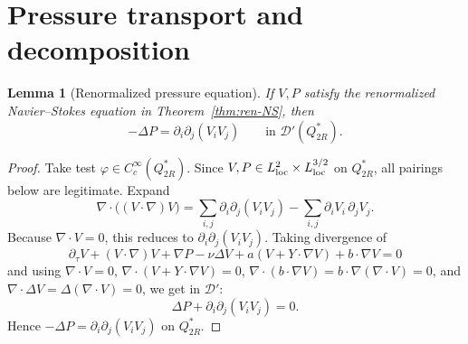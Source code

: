 \documentclass[11pt]{amsart}
\theoremstyle{plain}
\newtheorem{lemma}[theorem]{Lemma}
\theoremstyle{definition}
\theoremstyle{remark}
\newcommand{\nn}{\nabla}
\begin{document}
\section{Pressure transport and decomposition}\label{sec:pressure}
\begin{lemma}[Renormalized pressure equation]\label{lem:pressure-eq}
If \(V,P\) satisfy the renormalized Navier--Stokes equation in
Theorem~\ref{thm:ren-NS}, then
\[
-\Delta P=\partial_i\partial_j(V_iV_j)\qquad\text{in }\mathcal D'(Q_{2R}^*).
\]
\end{lemma}
\begin{proof}
Take test \(\varphi\in C_c^\infty(Q_{2R}^*)\). Since \(V,P\in L^2_{\rm loc}\times
L^{3/2}_{\rm loc}\) on \(Q_{2R}^*\), all pairings below are legitimate.
Expand
\[
\nn\cdot\bigl((V\cdot\nabla)V\bigr)
=\sum_{i,j}\partial_i\partial_j(V_iV_j)-\sum_{i,j}\partial_iV_i\,\partial_jV_j.
\]
Because \(\nn\cdot V=0\), this reduces to \(\partial_i\partial_j(V_iV_j)\).
Taking divergence of
\[
\partial_\tau V+(V\cdot\nabla)V+\nabla P-\nu\Delta V
+a(V+Y\cdot\nabla V)+b\cdot\nabla V=0
\]
and using \(\nn\cdot V=0\), \(\nn\cdot(V+Y\cdot\nabla V)=0\), \(\nn\cdot(b\cdot\nabla V)=b\cdot\nn(\nn\cdot V)=0\),
and \(\nn\cdot\Delta V=\Delta(\nn\cdot V)=0\), we get in \(\mathcal D'\):
\[
\Delta P+\partial_i\partial_j(V_iV_j)=0.
\]
Hence \(-\Delta P=\partial_i\partial_j(V_iV_j)\) on \(Q_{2R}^*\).
\end{proof}
\end{document}
